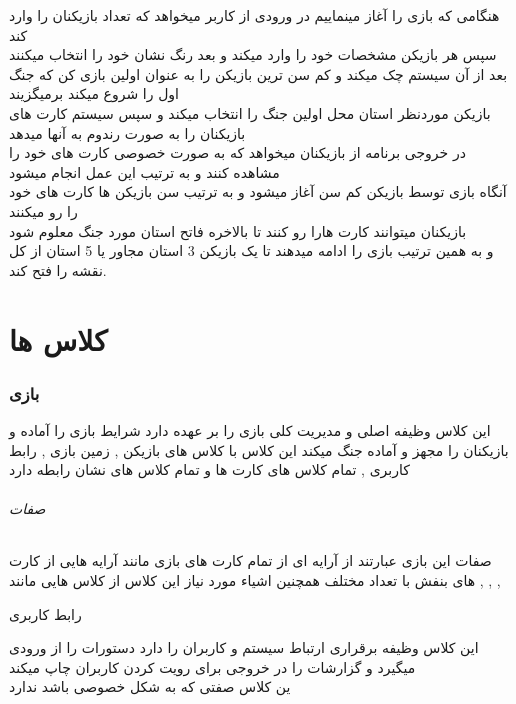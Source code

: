 \documentclass[pdf,titlepage,a4paper]{report}
\begin{document}
	\newpage
    \begin{gameplay}
     هنگامی که بازی را آغاز مینماییم در ورودی از کاربر میخواهد که تعداد بازیکنان را وارد کند \\
     سپس هر بازیکن مشخصات خود را وارد میکند و بعد رنگ نشان خود را انتخاب میکنند \\
	 بعد از آن سیستم چک میکند و کم سن ترین بازیکن را به عنوان اولین بازی کن که جنگ اول را شروع میکند برمیگزیند\\
	 بازیکن موردنظر استان محل اولین جنگ را انتخاب میکند و سپس سیستم کارت های بازیکنان را به صورت رندوم به آنها میدهد \\
	 در خروجی برنامه از بازیکنان میخواهد که به صورت خصوصی کارت های خود را مشاهده کنند و به ترتیب این عمل انجام میشود\\
	 آنگاه بازی توسط بازیکن کم سن آغاز میشود و به ترتیب سن بازیکن ها کارت های خود را رو میکنند\\
	 بازیکنان میتوانند کارت هارا رو کنند تا بالاخره فاتح استان مورد جنگ معلوم شود\\
	 و به همین ترتیب بازی را ادامه میدهند تا یک بازیکن 3 استان مجاور یا 5 استان از کل نقشه را فتح کند.\\
	\end{gameplay}
	
	\part{کلاس ها}
		
	\newpage
	\section{بازی}
	این کلاس وظیفه اصلی و مدیریت کلی بازی را بر عهده دارد شرایط بازی را آماده و بازیکنان را مجهز و آماده جنگ میکند
	این کلاس با کلاس های بازیکن , زمین بازی , رابط کاربری , تمام کلاس های کارت ها و تمام کلاس های نشان رابطه دارد
	\paragraph{صفات}
	صفات این بازی عبارتند از آرایه ای از تمام کارت های بازی مانند آرایه هایی از کارت های بنفش با تعداد مختلف
	همچنین اشیاء مورد نیاز این کلاس از کلاس هایی مانند  ,  ,  , 

	\subparagraph{رابط کاربری}
	این کلاس وظیفه برقراری ارتباط سیستم و کاربران را دارد دستورات را از ورودی میگیرد و گزارشات را در خروجی برای رویت کردن کاربران چاپ میکند\\
    ین کلاس صفتی که به شکل خصوصی باشد ندارد 
\end{document}
